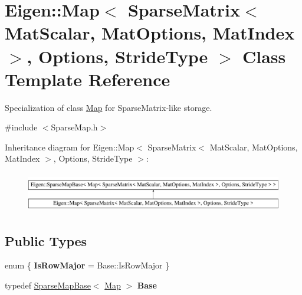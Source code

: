 \hypertarget{class_eigen_1_1_map_3_01_sparse_matrix_3_01_mat_scalar_00_01_mat_options_00_01_mat_index_01_4_002c859b470cc9e43a031929bd752a93e6}{}\section{Eigen\+::Map$<$ Sparse\+Matrix$<$ Mat\+Scalar, Mat\+Options, Mat\+Index $>$, Options, Stride\+Type $>$ Class Template Reference}
\label{class_eigen_1_1_map_3_01_sparse_matrix_3_01_mat_scalar_00_01_mat_options_00_01_mat_index_01_4_002c859b470cc9e43a031929bd752a93e6}


Specialization of class \mbox{\hyperlink{class_eigen_1_1_map}{Map}} for Sparse\+Matrix-\/like storage.  




{\ttfamily \#include $<$Sparse\+Map.\+h$>$}

Inheritance diagram for Eigen\+::Map$<$ Sparse\+Matrix$<$ Mat\+Scalar, Mat\+Options, Mat\+Index $>$, Options, Stride\+Type $>$\+:\begin{figure}[H]
\begin{center}
\leavevmode
\includegraphics[height=1.761006cm]{class_eigen_1_1_map_3_01_sparse_matrix_3_01_mat_scalar_00_01_mat_options_00_01_mat_index_01_4_002c859b470cc9e43a031929bd752a93e6}
\end{center}
\end{figure}
\subsection*{Public Types}
\begin{DoxyCompactItemize}
\item 
\mbox{\label{class_eigen_1_1_map_3_01_sparse_matrix_3_01_mat_scalar_00_01_mat_options_00_01_mat_index_01_4_002c859b470cc9e43a031929bd752a93e6_a7a424ebbe406da2c51ab5a33f1d3d26d}} 
enum \{ {\bfseries Is\+Row\+Major} = Base\+::Is\+Row\+Major
 \}
\item 
\mbox{\label{class_eigen_1_1_map_3_01_sparse_matrix_3_01_mat_scalar_00_01_mat_options_00_01_mat_index_01_4_002c859b470cc9e43a031929bd752a93e6_a46ebd3daf3b4cd2a77b48c6150b56e36}} 
typedef \mbox{\hyperlink{class_eigen_1_1_sparse_map_base}{Sparse\+Map\+Base}}$<$ \mbox{\hyperlink{class_eigen_1_1_map}{Map}} $>$ {\bfseries Base}
\end{DoxyCompactItemize}
